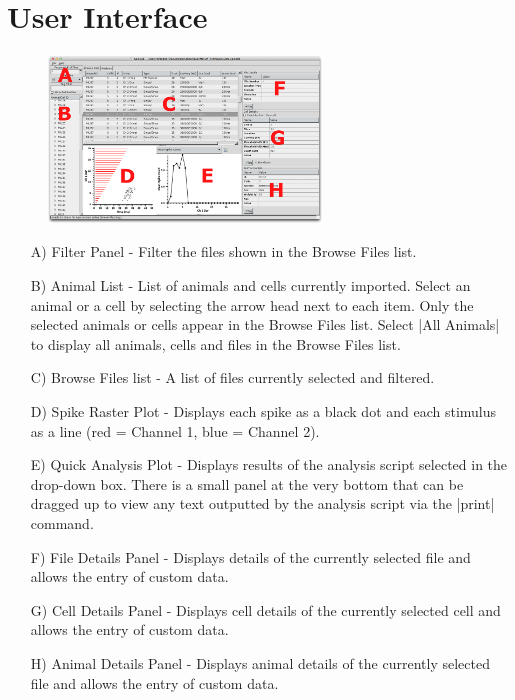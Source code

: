 \documentclass{report}
\begin{document}
\chapter{User Interface}
\begin{figure}[h]
\begin{center}
	\includegraphics[width=0.65\textwidth]{main_window_letters.png}
\end{center}
\end{figure}
\begin{itemize}
	\item[A)] Filter Panel - Filter the files shown in the Browse Files list.
	\item[B)] Animal List - List of animals and cells currently imported.  Select an animal or a cell by selecting the arrow head next to each item. Only the selected animals or cells appear in the Browse Files list. Select |All Animals| to display all animals, cells and files in the Browse Files list.
	\item[C)] Browse Files list - A list of files currently selected and filtered.
	\item[D)] Spike Raster Plot - Displays each spike as a black dot and each stimulus as a line (red = Channel 1, blue = Channel 2).
	\item[E)] Quick Analysis Plot - Displays results of the analysis script selected in the drop-down box. There is a small panel at the very bottom that can be dragged up to view any text outputted by the analysis script via the |print| command.
	\item[F)] File Details Panel - Displays details of the currently selected file and allows the entry of custom data.
	\item[G)] Cell Details Panel - Displays cell details of the currently selected cell and allows the entry of custom data.
	\item[H)] Animal Details Panel - Displays animal details of the currently selected file and allows the entry of custom data.
\end{itemize}
\end{document}
